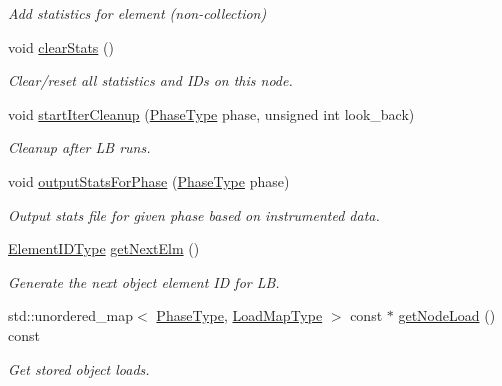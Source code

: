 \begin{DoxyCompactItemize}
\begin{DoxyCompactList}\small\item\em Add statistics for element (non-\/collection) \end{DoxyCompactList}\item 
void \hyperlink{structvt_1_1vrt_1_1collection_1_1balance_1_1_node_stats_a99adbf5c5165b274dd5abd761ed72c45}{clear\+Stats} ()
\begin{DoxyCompactList}\small\item\em Clear/reset all statistics and I\+Ds on this node. \end{DoxyCompactList}\item 
void \hyperlink{structvt_1_1vrt_1_1collection_1_1balance_1_1_node_stats_ae76790d41701769b86ef15e4924d661d}{start\+Iter\+Cleanup} (\hyperlink{namespacevt_a46ce6733d5cdbd735d561b7b4029f6d7}{Phase\+Type} phase, unsigned int look\+\_\+back)
\begin{DoxyCompactList}\small\item\em Cleanup after LB runs. \end{DoxyCompactList}\item 
void \hyperlink{structvt_1_1vrt_1_1collection_1_1balance_1_1_node_stats_aa6e33fd5ae9275515557ada40ef3d489}{output\+Stats\+For\+Phase} (\hyperlink{namespacevt_a46ce6733d5cdbd735d561b7b4029f6d7}{Phase\+Type} phase)
\begin{DoxyCompactList}\small\item\em Output stats file for given phase based on instrumented data. \end{DoxyCompactList}\item 
\hyperlink{namespacevt_1_1vrt_1_1collection_1_1balance_a592736f733df4f90856df90a1fd08905}{Element\+I\+D\+Type} \hyperlink{structvt_1_1vrt_1_1collection_1_1balance_1_1_node_stats_ac1b800713117d8f017746985a66dfbd2}{get\+Next\+Elm} ()
\begin{DoxyCompactList}\small\item\em Generate the next object element ID for LB. \end{DoxyCompactList}\item 
std\+::unordered\+\_\+map$<$ \hyperlink{namespacevt_a46ce6733d5cdbd735d561b7b4029f6d7}{Phase\+Type}, \hyperlink{namespacevt_1_1vrt_1_1collection_1_1balance_a5339303db2e1ce964d783a53fd74e6b1}{Load\+Map\+Type} $>$ const  $\ast$ \hyperlink{structvt_1_1vrt_1_1collection_1_1balance_1_1_node_stats_a5b34d26f9e10f7ff3ceb92b95f0ed2f6}{get\+Node\+Load} () const
\begin{DoxyCompactList}\small\item\em Get stored object loads. \end{DoxyCompactList}\item 

\end{DoxyCompactItemize}

